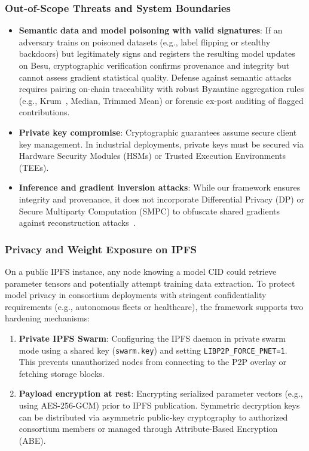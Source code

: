 \subsubsection{Out-of-Scope Threats and System Boundaries}
\begin{itemize}
    \item \textbf{Semantic data and model poisoning with valid signatures}: If an adversary trains on poisoned datasets (e.g., label flipping or stealthy backdoors) but legitimately signs and registers the resulting model updates on Besu, cryptographic verification confirms provenance and integrity but cannot assess gradient statistical quality. Defense against semantic attacks requires pairing on-chain traceability with robust Byzantine aggregation rules (e.g., Krum~\cite{blanchard2017byzantine}, Median, Trimmed Mean) or forensic ex-post auditing of flagged contributions.
    \item \textbf{Private key compromise}: Cryptographic guarantees assume secure client key management. In industrial deployments, private keys must be secured via Hardware Security Modules (HSMs) or Trusted Execution Environments (TEEs).
    \item \textbf{Inference and gradient inversion attacks}: While our framework ensures integrity and provenance, it does not incorporate Differential Privacy (DP) or Secure Multiparty Computation (SMPC) to obfuscate shared gradients against reconstruction attacks~\cite{carletti2026detectability}.
\end{itemize}

\subsubsection{Privacy and Weight Exposure on IPFS}
On a public IPFS instance, any node knowing a model CID could retrieve parameter tensors and potentially attempt training data extraction. To protect model privacy in consortium deployments with stringent confidentiality requirements (e.g., autonomous fleets or healthcare), the framework supports two hardening mechanisms:
\begin{enumerate}
    \item \textbf{Private IPFS Swarm}: Configuring the IPFS daemon in private swarm mode using a shared key (\texttt{swarm.key}) and setting \texttt{LIBP2P\_FORCE\_PNET=1}. This prevents unauthorized nodes from connecting to the P2P overlay or fetching storage blocks.
    \item \textbf{Payload encryption at rest}: Encrypting serialized parameter vectors (e.g., using AES-256-GCM) prior to IPFS publication. Symmetric decryption keys can be distributed via asymmetric public-key cryptography to authorized consortium members or managed through Attribute-Based Encryption (ABE).
\end{enumerate}
